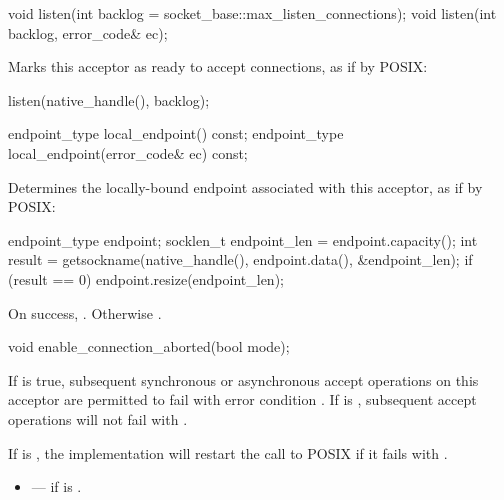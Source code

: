 \begin{itemdecl}
void listen(int backlog = socket_base::max_listen_connections);
void listen(int backlog, error_code& ec);
\end{itemdecl}

\begin{itemdescr}
\pnum
\effects Marks this acceptor as ready to accept connections, as if by POSIX:
\begin{codeblock}
listen(native_handle(), backlog);
\end{codeblock}
\end{itemdescr}

\begin{itemdecl}
endpoint_type local_endpoint() const;
endpoint_type local_endpoint(error_code& ec) const;
\end{itemdecl}

\begin{itemdescr}
\pnum
\effects Determines the locally-bound endpoint associated with this acceptor, as if by POSIX:
\begin{codeblock}
endpoint_type endpoint;
socklen_t endpoint_len = endpoint.capacity();
int result = getsockname(native_handle(), endpoint.data(), &endpoint_len);
if (result == 0)
  endpoint.resize(endpoint_len);
\end{codeblock}


\pnum
\returns On success, . Otherwise .
\end{itemdescr}

\begin{itemdecl}
void enable_connection_aborted(bool mode);
\end{itemdecl}

\begin{itemdescr}
\pnum
\effects If  is true, subsequent synchronous or asynchronous accept operations on this acceptor are permitted to fail with error condition . If  is , subsequent accept operations will not fail with . \begin{note} If  is , the implementation will restart the call to POSIX  if it fails with . \end{note}

\pnum
\errors
\begin{itemize}
\item
{} --- if  is .
\end{itemize}
\end{itemdescr}

